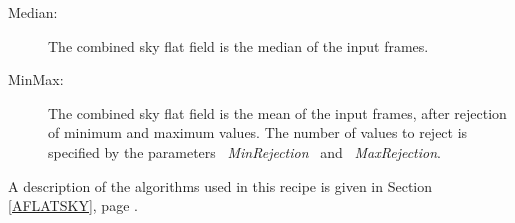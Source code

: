 \begin{description}
\begin{description}
  \item [Median:]   The combined sky flat field is the median of the 
                    input frames.

  \item [MinMax:]   The combined sky flat field is the mean of the 
                    input frames, after
                    rejection of minimum and maximum values.
                    The number of values to reject is specified by the 
                    parameters \ {\it MinRejection} \ and \ {\it MaxRejection}.

\end{description}

\end{description}

A description of the algorithms used in this recipe is given in Section
\ref{AFLATSKY}, page \pageref{AFLATSKY}.

